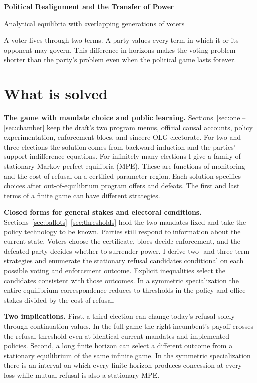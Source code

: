 \documentclass[11pt,letterpaper]{article}
\begin{document}
\thispagestyle{plain}
{\LARGE\bfseries Political Realignment and the Transfer of Power\par}
\vspace{2pt}
{\large Analytical equilibria with overlapping generations of voters\par}
\vspace{4pt}

A voter lives through two terms. A party values every term in which it or its opponent may govern. This difference in horizons makes the voting problem shorter than the party's problem even when the political game lasts forever.

\section{What is solved}
\textbf{The game with mandate choice and public learning.} Sections~\ref{sec:one}--\ref{sec:chamber} keep the draft's two program menus, official causal accounts, policy experimentation, enforcement blocs, and sincere OLG electorate. For two and three elections the solution comes from backward induction and the parties' support indifference equations. For infinitely many elections I give a family of stationary Markov perfect equilibria (MPE). These are functions of monitoring and the cost of refusal on a certified parameter region. Each solution specifies choices after out-of-equilibrium program offers and defeats. The first and last terms of a finite game can have different strategies.

\textbf{Closed forms for general stakes and electoral conditions.} Sections~\ref{sec:ballots}--\ref{sec:thresholds} hold the two mandates fixed and take the policy technology to be known. Parties still respond to information about the current state. Voters choose the certificate, blocs decide enforcement, and the defeated party decides whether to surrender power. I derive two- and three-term strategies and enumerate the stationary refusal candidates conditional on each possible voting and enforcement outcome. Explicit inequalities select the candidates consistent with those outcomes. In a symmetric specialization the entire equilibrium correspondence reduces to thresholds in the policy and office stakes divided by the cost of refusal.

\textbf{Two implications.} First, a third election can change today's refusal solely through continuation values. In the full game the right incumbent's payoff crosses the refusal threshold even at identical current mandates and implemented policies. Second, a long finite horizon can select a different outcome from a stationary equilibrium of the same infinite game. In the symmetric specialization there is an interval on which every finite horizon produces concession at every loss while mutual refusal is also a stationary MPE.
\end{document}

